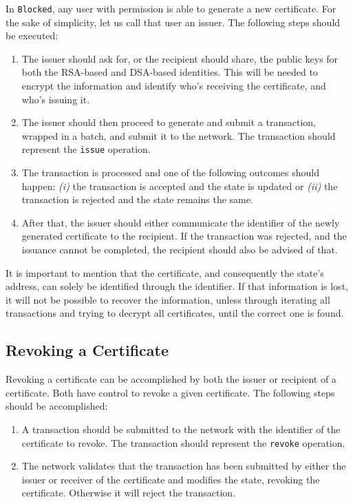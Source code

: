 In \texttt{Blocked}, any user with permission is able to generate a new certificate. For the sake of simplicity, let us call that user an issuer. The following steps should be executed:

\begin{enumerate}
	\item The issuer should ask for, or the recipient should share, the public keys for both the RSA-based and DSA-based identities. This will be needed to encrypt the information and identify who's receiving the certificate, and who's issuing it.
	\item The issuer should then proceed to generate and submit a transaction, wrapped in a batch, and submit it to the network. The transaction should represent the \texttt{issue} operation.
	\item The transaction is processed and one of the following outcomes should happen: \emph{(i)} the transaction is accepted and the state is updated or \emph{(ii)} the transaction is rejected and the state remains the same.
	\item After that, the issuer should either communicate the identifier of the newly generated certificate to the recipient. If the transaction was rejected, and the issuance cannot be completed, the recipient should also be advised of that.
\end{enumerate}

It is important to mention that the certificate, and consequently the state's address, can solely be identified through the identifier. If that information is lost, it will not be possible to recover the information, unless through iterating all transactions and trying to decrypt all certificates, until the correct one is found.

\subsection{Revoking a Certificate}

Revoking a certificate can be accomplished by both the issuer or recipient of a certificate. Both have control to revoke a given certificate. The following steps should be accomplished:

\begin{enumerate}
	\item A transaction should be submitted to the network with the identifier of the certificate to revoke. The transaction should represent the \texttt{revoke} operation.
	\item The network validates that the transaction has been submitted by either the issuer or receiver of the certificate and modifies the state, revoking the certificate. Otherwise it will reject the transaction.
\end{enumerate}

